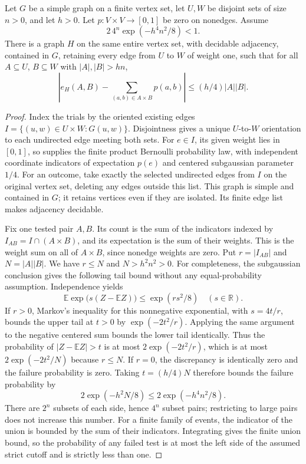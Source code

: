 \begin{lemma}
Let $G$ be a simple graph on a finite vertex set, let $U,W$ be disjoint
sets of size $n>0$, and let $h>0$. Let $p:V\times V\to[0,1]$ be zero
on nonedges. Assume
\[
 2\,4^n\exp(-h^4n^2/8)<1.
\]
There is a graph $H$ on the same entire vertex set, with decidable
adjacency, contained in $G$, retaining every edge from $U$ to $W$ of
weight one, such that for all $A\subseteq U$, $B\subseteq W$ with
$|A|,|B|>hn$,
\[
 \left|e_H(A,B)-\sum_{(a,b)\in A\times B}p(a,b)\right|
 \leq(h/4)|A||B|.
\]
\end{lemma}
\begin{proof}
Index the trials by the oriented existing edges
$I=\{(u,w)\in U\times W:G(u,w)\}$. Disjointness gives a unique
$U$-to-$W$ orientation to each undirected edge meeting both sets.
For $e\in I$, its given weight lies in $[0,1]$, so
 supplies the finite product
Bernoulli probability law, with independent coordinate indicators of
expectation $p(e)$ and centered subgaussian parameter $1/4$.
For an outcome, take exactly the selected undirected edges from $I$
on the original vertex set, deleting any edges outside this list.
This graph is simple and contained in $G$; it retains vertices even
if they are isolated. Its finite edge list makes adjacency decidable.

Fix one tested pair $A,B$. Its count is the sum of the indicators
indexed by $I_{AB}=I\cap(A\times B)$, and its expectation is the
sum of their weights. This is the weight sum on all of $A\times B$,
since nonedge weights are zero. Put $r=|I_{AB}|$ and $N=|A||B|$.
We have $r\leq N$ and $N>h^2n^2>0$. For completeness, the
subgaussian conclusion gives the following tail bound without any
equal-probability assumption. Independence yields
\[
 \mathbb E\exp\bigl(s(Z-\mathbb EZ)\bigr)\leq\exp(rs^2/8)
 \quad(s\in\mathbb R).
\]
If $r>0$, Markov's inequality for this nonnegative exponential,
with $s=4t/r$, bounds the upper tail at $t>0$ by
$\exp(-2t^2/r)$. Applying the same argument to the negative centered
sum bounds the lower tail identically. Thus the probability of
$|Z-\mathbb EZ|>t$ is at most $2\exp(-2t^2/r)$, which is at most
$2\exp(-2t^2/N)$ because $r\leq N$. If $r=0$, the discrepancy
is identically zero and the failure probability is zero.
Taking $t=(h/4)N$ therefore bounds the failure probability by
\[
 2\exp(-h^2N/8)\leq2\exp(-h^4n^2/8).
\]
There are $2^n$ subsets of each side, hence $4^n$ subset pairs;
restricting to large pairs does not increase this number. For a
finite family of events, the indicator of the union is bounded by
the sum of their indicators. Integrating gives the finite union
bound, so the probability of any failed test is at most the
left side of the assumed strict cutoff and is strictly less than one.


\end{proof}
